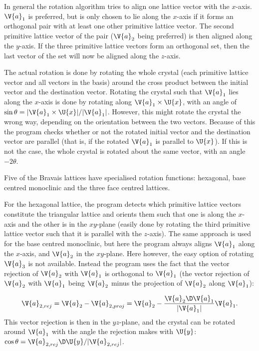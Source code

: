 \documentclass[main.tex]{subfiles}
\begin{document}
	In general the rotation algorithm tries to align one lattice vector with the $ x $-axis. $ \V{a}_1 $ is preferred, but is only chosen to lie along the $ x $-axis if it forms an orthogonal pair with at least one other primitive lattice vector. The second primitive lattice vector of the pair ($\V{a}_2$ being preferred) is then aligned along the $ y $-axis. If the three primitive lattice vectors form an orthogonal set, then the last vector of the set will now be aligned along the $ z $-axis.
	
	The actual rotation is done by rotating the whole crystal (each primitive lattice vector and all vectors in the basis) around the cross product between the initial vector and the destination vector. Rotating the crystal such that $ \V{a}_1 $ lies along the $ x $-axis is done by rotating along $ \V{a}_1 \times \U{x} $, with an angle of $ \sin \theta = |\V{a}_1 \times \U{x}| / |\V{a}_1| $. However, this might rotate the crystal the wrong way, depending on the orientation between the two vectors. Because of this the program checks whether or not the rotated initial vector and the destination vector are parallel (that is, if the rotated $ \V{a}_1 $ is parallel to $ \U{x} $). If this is not the case, the whole crystal is rotated about the same vector, with an angle $ -2\theta $.
	
	Five of the Bravais lattices have specialised rotation functions: hexagonal, base centred monoclinic and the three face centred lattices.
	
	For the hexagonal lattice, the program detects which primitive lattice vectors constitute the triangular lattice and orients them such that one is along the $ x $-axis and the other is in the $ xy $-plane (easily done by rotating the third primitive lattice vector such that it is parallel with the $ z $-axis). The same approach is used for the base centred monoclinic, but here the program always aligns $ \V{a}_1 $ along the $ x $-axis, and $ \V{a}_2 $ in the $ xy $-plane. Here however, the easy option of rotating $ \V{a}_3 $ is not available. Instead the program uses the fact that the vector rejection of $ \V{a}_2 $ with $ \V{a}_1 $ is orthogonal to $ \V{a}_1 $ (the vector rejection of $ \V{a}_2 $ with $ \V{a}_1 $ being $ \V{a}_2 $ minus the projection of $ \V{a}_2 $ along $ \V{a}_1 $):
	
	\begin{equation}
		\V{a}_{2,rej} = \V{a}_2 - \V{a}_{2, proj} = \V{a}_2 - \frac{\V{a}_2 \D \V{a}_1}{|\V{a}_1|} \V{a}_1.
	\end{equation}
	This vector rejection is then in the $ yz $-plane, and the crystal can be rotated around $ \V{a}_1 $ with the angle the rejection makes with $ \U{y} $: $ \cos \theta = \V{a}_{2,rej} \D \U{y} / |\V{a}_{2,rej}|$.
	
\end{document}
